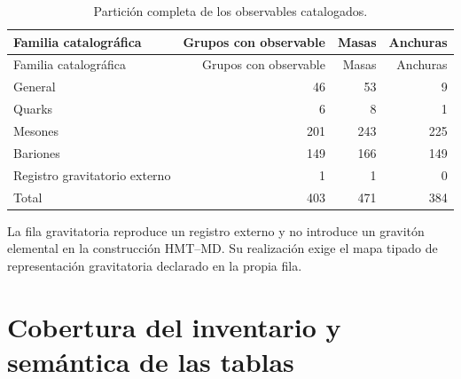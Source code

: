 \begin{longtable}{@{}lrrr@{}}
\caption{Partición completa de los observables catalogados.}
\label{tab:particion-inventario-total-rev6}\\
\toprule
Familia catalográfica & Grupos con observable & Masas & Anchuras\\
\midrule
\endfirsthead
\toprule
Familia catalográfica & Grupos con observable & Masas & Anchuras\\
\midrule
\endhead
General &46&53&9\\
Quarks&6&8&1\\
Mesones&201&243&225\\
Bariones&149&166&149\\
Registro gravitatorio externo&1&1&0\\
\midrule
Total&403&471&384\\
\bottomrule
\end{longtable}

La fila gravitatoria reproduce un registro externo y no introduce un gravitón
elemental en la construcción HMT--MD. Su realización exige el mapa tipado de
representación gravitatoria declarado en la propia fila.

\section{Cobertura del inventario y semántica de las tablas}

